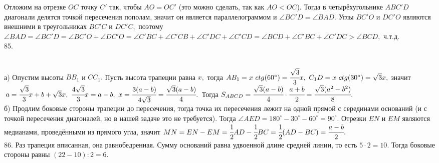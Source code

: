 \documentclass[12pt]{article}
\begin{document}
Отложим на отрезке $OC$ точку $C'$ так, чтобы $AO=OC'$ (это можно сделать, так как $AO<OC$). Тогда в четырёхугольнике $ABC'D$ диагонали делятся точкой пересечения пополам, значит он является параллелограммом и $\angle BC'D=\angle BAD.$ Углы $BC'O$ и $DC'O$ являются внешними в треугольниках $BC'C$ и $DC'C,$ поэтому $\angle BAD=\angle BC'D=\angle BC'O+\angle DC'O=\angle C'BC+\angle C'CB+\angle C'DC+\angle C'CD=\angle BCD+\angle C'BC+\angle C'DC>\angle BCD,$ ч.т.д.\\
85. \begin{figure}[ht!]
\end{figure}\\
а) Опустим высоты $BB_1$ и $CC_1.$ Пусть высота трапеции равна $x,$ тогда $AB_1=x\ ctg(60^\circ)=\cfrac{\sqrt{3}}{3}x,\ C_1D=x\ ctg(30^\circ)=\sqrt{3}x,$ значит $a=
\cfrac{\sqrt{3}}{3}x+b+\sqrt{3}x,\ \cfrac{4\sqrt{3}}{3}x=a-b,\ x=\cfrac{3(a-b)}{4\sqrt{3}}=\cfrac{\sqrt{3}(a-b)}{4}.$ Тогда
$S_{ABCD}=\cfrac{\sqrt{3}(a-b)}{4}\cdot\cfrac{a+b}{2}=\cfrac{\sqrt{3}(a^2-b^2)}{8}.$\\
б) Продлим боковые стороны трапеции до пересечения, тогда точка их пересечения лежит на одной прямой с серединами оснований (и с точкой пересечения диагоналей, но в нашей задаче это не требуется). Тогда $\angle AED=180^\circ-30^\circ-60^\circ=90^\circ.$ Отрезки $EN$ и $EM$ являются медианами, проведёнными из прямого угла, значит $MN=EN-EM=\cfrac{1}{2}AD-\cfrac{1}{2}BC=\cfrac{1}{2}(AD-BC)=\cfrac{a-b}{2}.$\\
86. Раз трапеция вписанная, она равнобедренная. Сумму оснований равна удвоенной длине средней линии, то есть $5\cdot2=10.$ Тогда боковые стороны равны $(22-10):2=6.$\newpage\noindent
\end{document}

